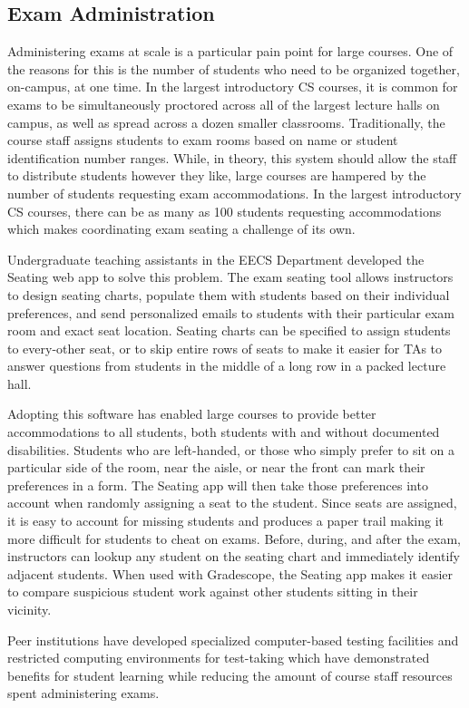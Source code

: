 \subsection{Exam Administration}

Administering exams at scale is a particular pain point for large courses. One of the reasons for this is the number of students who need to be organized together, on-campus, at one time. In the largest introductory CS courses, it is common for exams to be simultaneously proctored across all of the largest lecture halls on campus, as well as spread across a dozen smaller classrooms. Traditionally, the course staff assigns students to exam rooms based on name or student identification number ranges. While, in theory, this system should allow the staff to distribute students however they like, large courses are hampered by the number of students requesting exam accommodations. In the largest introductory CS courses, there can be as many as 100 students requesting accommodations which makes coordinating exam seating a challenge of its own.

Undergraduate teaching assistants in the EECS Department developed the Seating web app to solve this problem. The exam seating tool allows instructors to design seating charts, populate them with students based on their individual preferences, and send personalized emails to students with their particular exam room and exact seat location. Seating charts can be specified to assign students to every-other seat, or to skip entire rows of seats to make it easier for TAs to answer questions from students in the middle of a long row in a packed lecture hall.

Adopting this software has enabled large courses to provide better accommodations to all students, both students with and without documented disabilities. Students who are left-handed, or those who simply prefer to sit on a particular side of the room, near the aisle, or near the front can mark their preferences in a form. The Seating app will then take those preferences into account when randomly assigning a seat to the student. Since seats are assigned, it is easy to account for missing students and produces a paper trail making it more difficult for students to cheat on exams. Before, during, and after the exam, instructors can lookup any student on the seating chart and immediately identify adjacent students. When used with Gradescope, the Seating app makes it easier to compare suspicious student work against other students sitting in their vicinity.

Peer institutions have developed specialized computer-based testing facilities \cite{Nip:2018, West:2016} and restricted computing environments for test-taking \cite{Piech:2018} which have demonstrated benefits for student learning while reducing the amount of course staff resources spent administering exams.